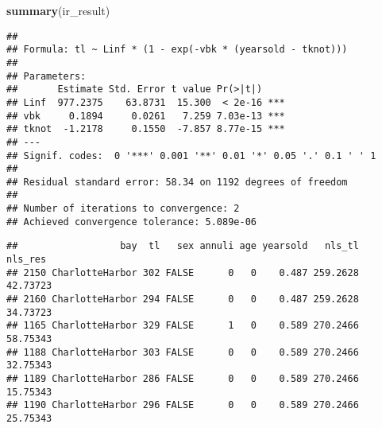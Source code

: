 \documentclass[
]{article}
\newenvironment{Shaded}{\begin{snugshade}}{\end{snugshade}}
\newcommand{\KeywordTok}[1]{\textcolor[rgb]{0.13,0.29,0.53}{\textbf{#1}}}
\newcommand{\NormalTok}[1]{#1}
\newcommand{\OperatorTok}[1]{\textcolor[rgb]{0.81,0.36,0.00}{\textbf{#1}}}
\newcommand{\StringTok}[1]{\textcolor[rgb]{0.31,0.60,0.02}{#1}}
\begin{document}
\begin{Shaded}
\begin{Highlighting}[]
\KeywordTok{summary}\NormalTok{(ir\_result)}
\end{Highlighting}
\end{Shaded}

\begin{verbatim}
## 
## Formula: tl ~ Linf * (1 - exp(-vbk * (yearsold - tknot)))
## 
## Parameters:
##       Estimate Std. Error t value Pr(>|t|)    
## Linf  977.2375    63.8731  15.300  < 2e-16 ***
## vbk     0.1894     0.0261   7.259 7.03e-13 ***
## tknot  -1.2178     0.1550  -7.857 8.77e-15 ***
## ---
## Signif. codes:  0 '***' 0.001 '**' 0.01 '*' 0.05 '.' 0.1 ' ' 1
## 
## Residual standard error: 58.34 on 1192 degrees of freedom
## 
## Number of iterations to convergence: 2 
## Achieved convergence tolerance: 5.089e-06
\end{verbatim}

\begin{Shaded}
\end{Shaded}

\begin{verbatim}
##                  bay  tl   sex annuli age yearsold   nls_tl  nls_res
## 2150 CharlotteHarbor 302 FALSE      0   0    0.487 259.2628 42.73723
## 2160 CharlotteHarbor 294 FALSE      0   0    0.487 259.2628 34.73723
## 1165 CharlotteHarbor 329 FALSE      1   0    0.589 270.2466 58.75343
## 1188 CharlotteHarbor 303 FALSE      0   0    0.589 270.2466 32.75343
## 1189 CharlotteHarbor 286 FALSE      0   0    0.589 270.2466 15.75343
## 1190 CharlotteHarbor 296 FALSE      0   0    0.589 270.2466 25.75343
\end{verbatim}
\end{document}
